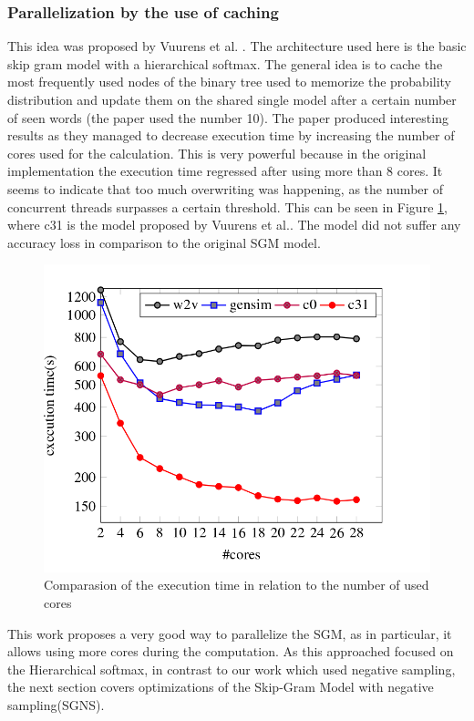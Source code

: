 \subsubsection{Parallelization by the use of caching}
This idea was proposed by Vuurens et al. \cite{efficient}. The architecture used here is the basic skip gram model with a hierarchical softmax. The general idea is to cache the most frequently used nodes of the binary tree used to memorize the probability distribution and update them on the shared single model after a certain number of seen words (the paper used the number 10). The paper produced interesting results as they managed to decrease execution time by increasing the number of cores used for the calculation. This is very powerful because in the original implementation the execution time regressed after using more than 8 cores. It seems to indicate that too much overwriting was happening, as the number of concurrent threads surpasses a certain threshold. This can be seen in Figure \ref{fig:efficient}, where c31 is the model proposed by Vuurens et al.\cite{efficient}. The model did not suffer any accuracy loss in comparison to the original SGM model.
\begin{figure}[ht]
\centering
\includegraphics[scale=0.3]{images/cachingEfficiency.png}
\caption{Comparasion of the execution time in relation to the number of used cores \cite{efficient}}
\label{fig:efficient}
\end{figure}
This work proposes a very good way to parallelize the SGM, as in particular, it allows using more cores during the computation. As this approached focused on the Hierarchical softmax, in contrast to our work which used negative sampling, the next section covers optimizations of the Skip-Gram Model with negative sampling(SGNS).

